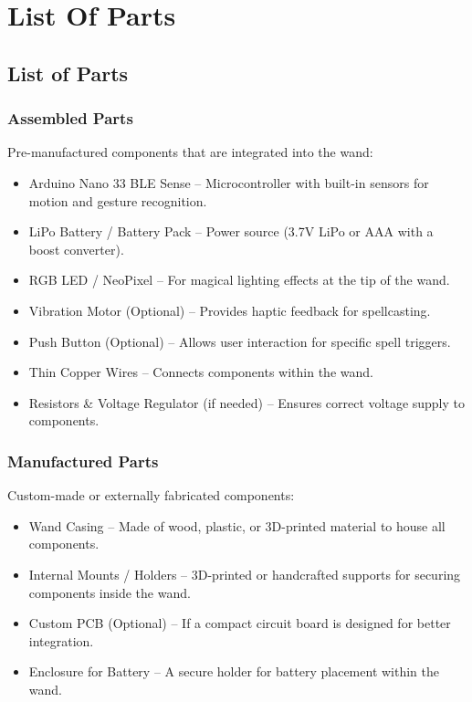 %
%

\chapter{List Of Parts}

\section{List of Parts}
\subsection{Assembled Parts}
Pre-manufactured components that are integrated into the wand:
\begin{itemize}
	\item Arduino Nano 33 BLE Sense – Microcontroller with built-in sensors for motion and gesture recognition.
	\item LiPo Battery / Battery Pack – Power source (3.7V LiPo or AAA with a boost converter).
	\item RGB LED / NeoPixel – For magical lighting effects at the tip of the wand.
	\item Vibration Motor (Optional) – Provides haptic feedback for spellcasting.
	\item Push Button (Optional) – Allows user interaction for specific spell triggers.
	\item Thin Copper Wires – Connects components within the wand.
	\item Resistors \& Voltage Regulator (if needed) – Ensures correct voltage supply to components.
\end{itemize}

\subsection{Manufactured Parts}
Custom-made or externally fabricated components:
\begin{itemize}
	\item Wand Casing – Made of wood, plastic, or 3D-printed material to house all components.
	\item Internal Mounts / Holders – 3D-printed or handcrafted supports for securing components inside the wand.
	\item Custom PCB (Optional) – If a compact circuit board is designed for better integration.
	\item Enclosure for Battery – A secure holder for battery placement within the wand.
\end{itemize}


